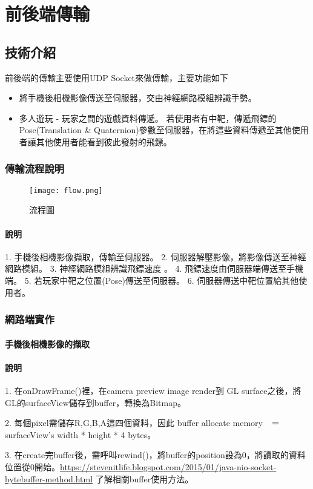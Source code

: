 \chapter{前後端傳輸}
\section{技術介紹}
前後端的傳輸主要使用UDP Socket來做傳輸，主要功能如下
\begin{itemize}
\item 將手機後相機影像傳送至伺服器，交由神經網路模組辨識手勢。
\item 多人遊玩 - 玩家之間的遊戲資料傳遞。 若使用者有中靶，傳遞飛鏢的Pose(Translation & Quaternion)參數至伺服器，在將這些資料傳遞至其他使用者讓其他使用者能看到彼此發射的飛鏢。
\end{itemize}
\subsection{傳輸流程說明}
\begin{figure}[h]
    \centering	
    \texttt{[image: flow.png]}
    \caption{流程圖}
    \label{fig:flow}
\end{figure}
\subsubsection{說明}
1. 手機後相機影像擷取，傳輸至伺服器。
2. 伺服器解壓影像，將影像傳送至神經網路模組。
3. 神經網路模組辨識飛鏢速度 。
4. 飛鏢速度由伺服器端傳送至手機端。
5. 若玩家中靶之位置(Pose)傳送至伺服器。
6. 伺服器傳送中靶位置給其他使用者。
\subsection{網路端實作}
\subsubsection{手機後相機影像的擷取}
\subsubsection{說明}
1. 在onDrawFrame()裡，在camera preview image render到 GL surface之後，將GL的surfaceView儲存到buffer，轉換為Bitmap。

2. 每個pixel需儲存R,G,B,A這四個資料，因此 buffer allocate memory　＝　surfaceView’s width * height * 4 bytes。

3. 在create完buffer後，需呼叫rewind()，將buffer的position設為0，將讀取的資料位置從0開始。\href{可於此處}{https://stevenitlife.blogspot.com/2015/01/java-nio-socket-bytebuffer-method.html} 了解相關buffer使用方法。

